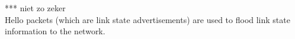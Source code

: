 *** niet zo zeker \\
Hello packets (which are link state advertisements) are used to flood link state information to the network.
